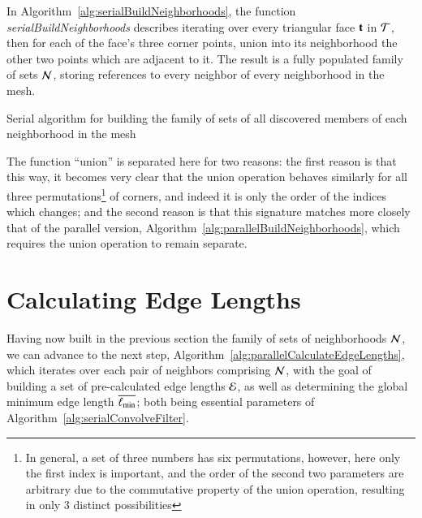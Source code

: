 In Algorithm~\ref{alg:serialBuildNeighborhoods}, the function \textit{serialBuildNeighborhoods} describes iterating over every triangular face $\mathbf{t}$ in $\mathcal{T}$, then for each of the face's three corner points, union into its neighborhood the other two points which are adjacent to it. The result is a fully populated family of sets $\mathcal{N}$, storing references to every neighbor of every neighborhood in the mesh.

\begin{algorithm}[ht]
	\DontPrintSemicolon


	\bigskip
\nl	{}

	\bigskip
\nl	{}
	\caption{Serial algorithm for building the family of sets of all discovered members of each neighborhood in the mesh\label{alg:serialBuildNeighborhoods}}
\end{algorithm}%

The function ``union'' is separated here for two reasons: the first reason is that this way, it becomes very clear that the union operation behaves similarly for all three permutations\footnote{In general, a set of three numbers has six permutations, however, here only the first index is important, and the order of the second two parameters are arbitrary due to the commutative property of the union operation, resulting in only 3 distinct possibilities} of corners, and indeed it is only the order of the indices which changes; and the second reason is that this signature matches more closely that of the parallel version, Algorithm~\ref{alg:parallelBuildNeighborhoods}, which requires the union operation to remain separate.

%
%
%
%
\section{Calculating Edge Lengths}
\label{ch5sCEL}
Having now built in the previous section the family of sets of neighborhoods $\mathcal{N}$, we can advance to the next step, Algorithm~\ref{alg:parallelCalculateEdgeLengths}, which iterates over each pair of neighbors comprising $\mathcal{N}$, with the goal of building a set of pre-calculated edge lengths $\mathcal{E}$, as well as determining the global minimum edge length $\overline{\ell_\text{min}}$; both being essential parameters of Algorithm~\ref{alg:serialConvolveFilter}.

